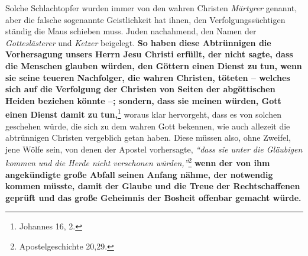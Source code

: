 Solche Schlachtopfer wurden immer von den wahren Christen
\textit{Märtyrer} genannt,
aber die falsche sogenannte Geistlichkeit
hat ihnen, den Verfolgungssüchtigen
ständig die Maus schieben muss.
Juden nachahmend, den Namen der
\textit{Gotteslästerer} und
\textit{Ketzer} beigelegt.  \label{ref:07_16_vervolgung}
\textbf{So haben diese Abtrünnigen die Vorhersagung
unsers Herrn Jesu Christi erfüllt, der nicht sagte, dass die Menschen glauben
würden, den Göttern einen Dienst zu tun, wenn sie seine teueren Nachfolger, die
wahren Christen, töteten
-- welches sich auf die Verfolgung der Christen von Seiten der abgöttischen
Heiden beziehen könnte --; sondern, dass sie meinen
würden, Gott einen Dienst
damit zu tun,}\footnote{Johannes 16, 2.}
woraus klar hervorgeht, dass es von solchen
geschehen würde, die sich zu dem wahren Gott bekennen, wie auch allezeit die
abtrünnigen Christen vergeblich getan haben. Diese müssen also, ohne Zweifel,
jene Wölfe sein, von denen der Apostel vorhersagte,
\textit{"`dass sie unter die
Gläubigen kommen und die Herde nicht verschonen
würden,"'}\footnote{Apostelgeschichte 20,29.}
\textbf{wenn der von ihm angekündigte große Abfall seinen Anfang nähme, der
notwendig kommen müsste, damit der Glaube und die Treue der
Rechtschaffenen
geprüft und das große Geheimnis der Bosheit offenbar gemacht würde.}

\medskip

